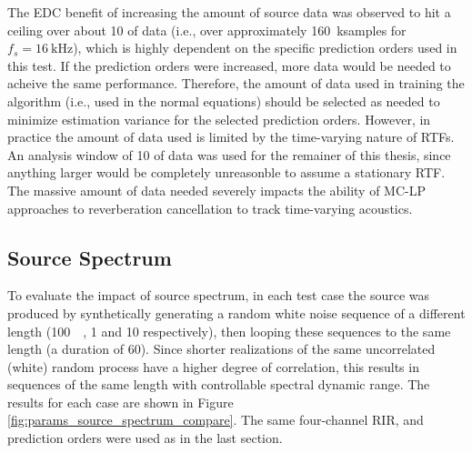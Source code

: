 The EDC benefit of increasing the amount of source data was observed to hit a ceiling over about \qty{10}{\sec} of data (i.e., over approximately \qty{160}{\kilo samples} for $f_s=\qty{16}{\kilo\hertz}$), which is highly dependent on the specific prediction orders used in this test. If the prediction orders were increased, more data would be needed to acheive the same performance. Therefore, the amount of data used in training the algorithm (i.e., used in the normal equations) should be selected as needed to minimize estimation variance for the selected prediction orders. However, in practice the amount of data used is limited by the time-varying nature of RTFs. An analysis window of \qty{10}{\sec} of data was used for the remainer of this thesis, since anything larger would be completely unreasonble to assume a stationary RTF. The massive amount of data needed severely impacts the ability of MC-LP approaches to reverberation cancellation to track time-varying acoustics.

\subsection{Source Spectrum}

To evaluate the impact of source spectrum, in each test case the source was produced by synthetically generating a random white noise sequence of a different length (\qty{100}{\milli\sec}, \qty{1}{\sec} and \qty{10}{\sec} respectively), then looping these sequences to the same length (a duration of \qty{60}{\sec}). Since shorter realizations of the same uncorrelated (white) random process have a higher degree of correlation, this results in sequences of the same length with controllable spectral dynamic range. The results for each case are shown in Figure \ref{fig:params_source_spectrum_compare}. The same four-channel RIR, and prediction orders were used as in the last section.


